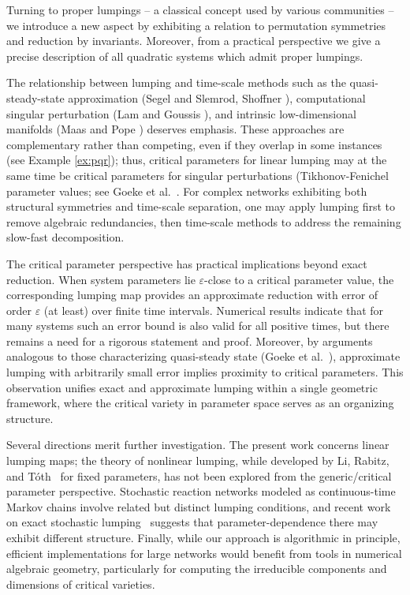 \documentclass{article}
\begin{document}
Turning to proper lumpings -- a classical concept used by various communities -- we introduce a new aspect by exhibiting a relation to permutation symmetries and reduction by invariants. Moreover, from a practical perspective we give a precise description of all quadratic systems which admit proper lumpings.

The relationship between lumping and time-scale methods such as the quasi-steady-state 
approximation (Segel and Slemrod\cite{SegelSlemrod1989}, Shoffner \cite{Shoffner}), computational singular 
perturbation (Lam and Goussis \cite{LamGoussis1994}), and intrinsic low-dimensional manifolds (Maas and Pope \cite{MaasPope1992}) 
deserves emphasis. These approaches are complementary rather than competing, even if they overlap in some instances (see Example \ref{ex:pqr}); thus, critical parameters for linear lumping may at the same time be critical parameters for singular perturbations (Tikhonov-Fenichel parameter values; see Goeke et al.~\cite{gwz}. For complex networks exhibiting both structural symmetries and time-scale 
separation, one may apply lumping first to remove algebraic redundancies, then 
time-scale methods to address the remaining slow-fast decomposition.


The critical parameter perspective has practical implications beyond exact reduction. When system parameters lie $\varepsilon$-close to a critical parameter value, the corresponding lumping map provides an approximate reduction with error of order $\varepsilon$ (at least) over finite time intervals. Numerical results indicate that for many systems such an error bound is also valid for all positive times, but there remains a need for a rigorous statement and proof. Moreover, by arguments analogous to those characterizing quasi-steady state (Goeke et al.~\cite{GWZ2015}), approximate lumping with arbitrarily small error implies proximity to critical parameters. This observation unifies exact and approximate lumping within a single geometric framework, where the critical variety in parameter space serves as an organizing structure.

Several directions merit further investigation. The present work concerns linear lumping
maps; the theory of nonlinear lumping, while developed by Li, Rabitz, and T\'oth~\cite{LRT1994} 
for fixed parameters, has not been explored from the generic/critical parameter 
perspective. Stochastic reaction networks modeled as continuous-time Markov chains 
involve related but distinct lumping conditions, and recent work on exact stochastic 
lumping~\cite{CardelliStochastic2021} suggests that parameter-dependence there may exhibit 
different structure. Finally, while our approach is algorithmic in principle, efficient 
implementations for large networks would benefit from tools in numerical algebraic 
geometry, particularly for computing the irreducible components and dimensions of 
critical varieties.
\end{document}
